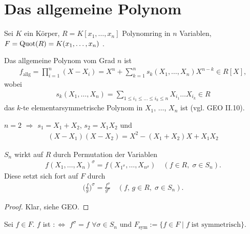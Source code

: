 \section{Das allgemeine Polynom}

Sei $K$ ein Körper, $R = K[x_1,\dots,x_n]$ Polynomring in $n$ Variablen, $F = \operatorname{Quot}(R) = K(x_1,\dots,x_n)$ .

\begin{definition}
	Das allgemeine Polynom vom Grad $n$ ist \begin{align*}
		f_{\mathrm{allg}} = \prod_{i=1}^n (X-X_i) = X^n + \sum_{k=1}^n s_k(X_1,\dots,X_n) X^{n-k} \in R[X],
	\end{align*}
	wobei
	\begin{align*}
		s_k(X_1,\dots,X_n) = \sum_{1\le i_1\le \ldots \le i_k \le n} X_{i_1} \dots X_{i_k} \in R
	\end{align*}
	das $k$-te elementarsymmetrische Polynom in $X_1$, $\dots$, $X_n$ ist (vgl. GEO II.10).
\end{definition}

\begin{example}
	$n=2$ $\Rightarrow$ $s_1 = X_1 + X_2$, $s_2 = X_1 X_2$ und \begin{align*}
		(X-X_1)(X-X_2) = X^2 - (X_1 + X_2) X + X_1 X_2
	\end{align*}
\end{example}

\begin{lemma}
	$S_n$ wirkt auf $R$ durch Permutation der Variablen \begin{align*}
		f(X_1,\dots,X_n)^\sigma  = f(X_{1^\sigma},\dots,X_{n^\sigma})\quad(f\in R,\;\sigma\in S_n).
	\end{align*}
	Diese setzt sich fort auf $F$ durch \begin{align*}
		\bigg( \frac fg\bigg)^\sigma = \frac{f^\sigma}{g^\sigma}\quad(f,\,g\in R,\; \sigma\in S_n).
	\end{align*}
\end{lemma}

\begin{proof}
	Klar, siehe GEO.
\end{proof}

\begin{definition}
	Sei $f\in F$. $f$ ist  $:\Leftrightarrow$ $f^\sigma = f$ $\forall\sigma\in S_n$ und $F_{\mathrm{sym}} := \lbrace f\in F\mid f\;\text{ist symmetrisch}\rbrace$.
\end{definition}

